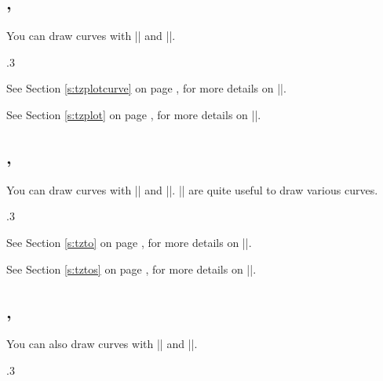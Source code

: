 \subsection{\protect\cmd{\tzplotcurve}, \protect\cmd{\tzplot}}

You can draw curves with |\tzplotcurve| and |\tzplot|.

\begin{tzcode}{.3}
\end{tzcode}


See Section \ref{s:tzplotcurve} on page \pageref{s:tzplotcurve}, for more details on |\tzplotcurve|.

See Section \ref{s:tzplot} on page \pageref{s:tzplot}, for more details on |\tzplot|.


\subsection{\protect\cmd{\tzto}, \protect\cmd{\tztos}}
\label{ss:curves:tzto}

You can draw curves with |\tzto| and |\tztos|.
|\tztos| are quite useful to draw various curves.

\begin{tzcode}{.3}
{}
\end{tzcode}

See Section \ref{s:tzto} on page \pageref{s:tzto}, for more details on |\tzto|.

See Section \ref{s:tztos} on page \pageref{s:tztos}, for more details on |\tztos|.

\subsection{\protect\cmd{\tzlink}, \protect\cmd{\tzlinks}}
\label{ss:curves:tzlink}

You can also draw curves with |\tzlink| and |\tzlinks|.

\begin{tzcode}{.3}
{}
\end{tzcode}

